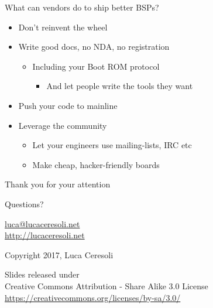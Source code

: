 \documentclass[xetex,table,aspectratio=169]{beamer}
\begin{document}
\begin{frame}{What can vendors do to ship better BSPs?}
  \begin{itemize}
  \item Don't reinvent the wheel
  \item Write good docs, no NDA, no registration
    \begin{itemize}
    \item Including your Boot ROM protocol
      \begin{itemize}
      \item And let people write the tools they want
      \end{itemize}
    \end{itemize}
  \item Push your code to mainline
  \item Leverage the community
    \begin{itemize}
    \item Let your engineers use mailing-lists, IRC etc
    \item Make cheap, hacker-friendly boards
    \end{itemize}
  \end{itemize}
\end{frame}

\begin{frame}
  \begin{center}
    Thank you for your attention

    \vspace{0.15\textheight}

    {\Huge Questions?}

    \vspace{0.15\textheight}

    \href{mailto:luca@lucaceresoli.net}{luca@lucaceresoli.net}\\
    \url{http://lucaceresoli.net}

    \textcopyright{} Copyright 2017, Luca Ceresoli\\

    \vspace{0.05\textheight}

    \tiny
    Slides released under\\
    Creative Commons Attribution - Share Alike 3.0 License \\
    \url{https://creativecommons.org/licenses/by-sa/3.0/} \\
\end{center}
\end{frame}
\end{document}
